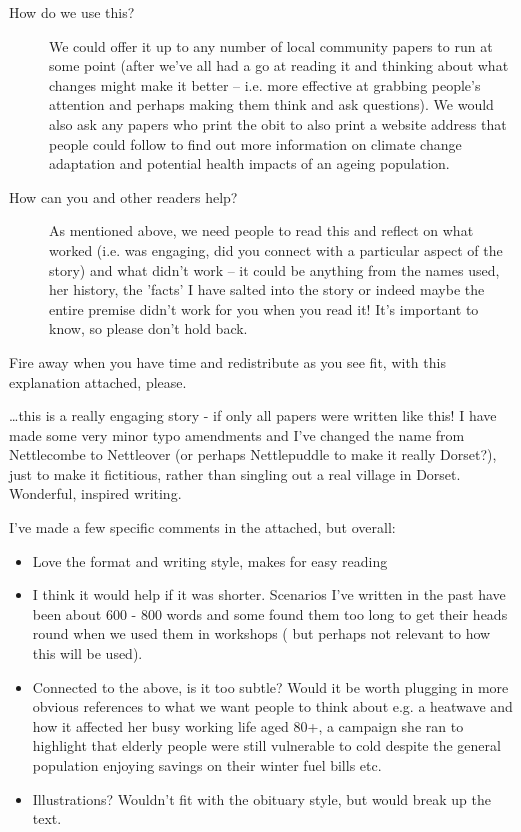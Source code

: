 \begin{description}
	\item [How do we use this?] We could offer it up to any number of local community papers to run at some point (after we've all had a go at reading it and thinking about what changes might make it better -- i.e. more effective at grabbing people's attention and perhaps making them think and ask questions). We would also ask any papers who print the obit to also print a website address that people could follow to find out more information on climate change adaptation and potential health impacts of an ageing population.
	\item [How can you and other readers help?] As mentioned above, we need people to read this and reflect on what worked (i.e. was engaging, did you connect with a particular aspect of the story) and what didn't work -- it could be anything from the names used, her history, the 'facts' I have salted into the story or indeed maybe the entire premise didn't work for you when you read it! It's important to know, so please don't hold back. 
\end{description}

Fire away when you have time and redistribute as you see fit, with this explanation attached, please.

\dots this is a really engaging story - if only all papers were written like this!  I have made some very minor typo amendments and I've changed the name from Nettlecombe to Nettleover (or perhaps Nettlepuddle to make it really Dorset?), just to make it fictitious, rather than singling out a real village in Dorset.  Wonderful, inspired writing.

I've made a few specific comments in the attached, but overall:

\begin{itemize}
	\item Love the format and writing style,  makes for easy reading
	\item I think it would help if it was shorter. Scenarios I've written in the past have been about 600 - 800 words and some found them too long to get their heads round when we used them in workshops ( but perhaps not relevant to how this will be used).
	\item Connected to the above, is it too subtle? Would it be worth plugging in more obvious references to what we want people to think about e.g. a heatwave and how it affected her busy working life aged 80+, a campaign she ran to highlight that elderly people were still vulnerable to cold despite the general population enjoying savings on their winter fuel bills etc.  
	\item Illustrations? Wouldn't fit with the obituary style, but would break up the text.
\end{itemize}

